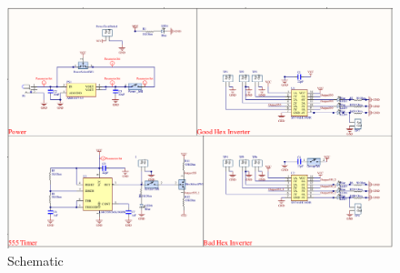 \documentclass[a4paper,11pt]{article}%
\begin{document}
\begin{figure}[H]
	\centering
	\includegraphics[scale=0.4]{figures/schematic.png}
	\caption{Schematic}
\end{figure}
\end{document}
